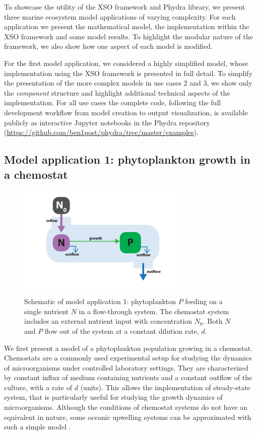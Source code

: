 \documentclass[journal abbreviation, manuscript]{copernicus}
\begin{document}
To showcase the utility of the XSO framework and Phydra library, we present three marine ecosystem model applications of varying complexity. For each application we present the mathematical model, the implementation within the XSO framework and some model results. To highlight the modular nature of the framework, we also show how one aspect of each model is modified.

For the first model application, we considered a highly simplified model, whose implementation using the XSO framework is presented in full detail. To simplify the presentation of the more complex models in use cases 2 and 3, we show only the \textit{component} structure and highlight additional technical aspects of the implementation. For all use cases the complete code, following the full development workflow from model creation to output visualization, is available publicly as interactive Jupyter notebooks in the Phydra repository (\url{https://github.com/ben1post/phydra/tree/master/examples}).

\subsection{Model application 1: phytoplankton growth in a chemostat}
\begin{figure}[t]
\includegraphics[width=8.3cm]{Figures/firstdraft_schematics/01_schematics_Chemostat.pdf}
\caption{Schematic of model application 1: phytoplankton $P$ feeding on a single nutrient $N$ in a flow-through system. The chemostat system includes an external nutrient input with concentration $N_0$. Both $N$ and $P$ flow out of the system at a constant dilution rate, $d$.}
\label{Figure:ModelSchematics_1}
\end{figure}

We first present a model of a phytoplankton population growing in a chemostat. Chemostats are a commonly used experimental setup for studying the dynamics of microorganisms under controlled laboratory settings. They are characterized by constant influx of medium containing nutrients and a constant outflow of the culture, with a rate of $d$ (units). This allows the implementation of steady-state system, that is particularly useful for studying the growth dynamics of microorganisms. Although the conditions of chemostat systems do not have an equivalent in nature, some oceanic upwelling systems can be approximated with such a simple model \citep{Haefner2005ModelingApplications}.
\end{document}
